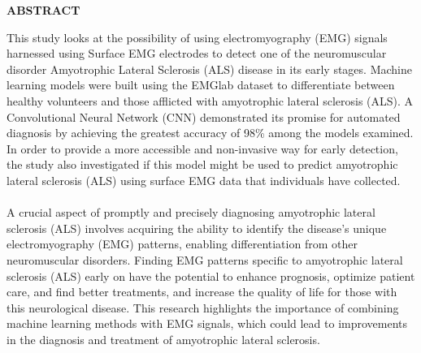 \documentclass[ 12pt,a4paper,twocolumn,fleqn]{report}
\begin{document}
\newpage
  \pagestyle{fancy}
\thisfancypage{%
  \setlength{\fboxsep}{20pt}\doublebox}{}
\begin{center}
    \huge\textbf{ABSTRACT}
\end{center}
\vspace{15mm}
This study looks at the possibility of using electromyography
(EMG) signals harnessed using Surface EMG electrodes to detect
one of the neuromuscular disorder Amyotrophic Lateral Sclerosis
(ALS) disease in its early stages. Machine learning models were
built using the EMGlab dataset to differentiate between healthy
volunteers and those afflicted with amyotrophic lateral sclerosis
(ALS). A Convolutional Neural Network (CNN) demonstrated its
promise for automated diagnosis by achieving the greatest accuracy
of 98\% among the models examined. In order to provide a more
accessible and non-invasive way for early detection, the study also
investigated if this model might be used to predict amyotrophic lateral
sclerosis (ALS) using surface EMG data that individuals have
collected.
\\
\hfill
\\
A crucial aspect of promptly and precisely diagnosing amyotrophic
lateral sclerosis (ALS) involves acquiring the ability to identify
the disease’s unique electromyography (EMG) patterns, enabling
differentiation from other neuromuscular disorders. Finding EMG
patterns specific to amyotrophic lateral sclerosis (ALS) early on have
the potential to enhance prognosis, optimize patient care, and find better
treatments, and increase the quality of life for those with this neurological
disease. This research highlights the importance of combining
machine learning methods with EMG signals, which could lead to
improvements in the diagnosis and treatment of amyotrophic lateral
sclerosis.
\\
\hfill


\newpage
    \pagestyle{combined}
\thisfancypage{%
  \setlength{\fboxsep}{20pt}\doublebox}{}
\end{document}
